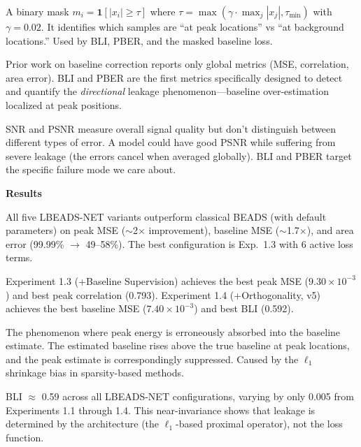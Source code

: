 \documentclass[11pt, letterpaper]{article}
\begin{document}
{A binary mask $m_i = \mathbf{1}[|x_i| \geq \tau]$ where $\tau = \max(\gamma \cdot \max_j |x_j|, \tau_{\min})$ with $\gamma = 0.02$.  It identifies which samples are ``at peak locations'' vs ``at background locations.''  Used by BLI, PBER, and the masked baseline loss.}

{Prior work on baseline correction reports only global metrics (MSE, correlation, area error).  BLI and PBER are the first metrics specifically designed to detect and quantify the \emph{directional} leakage phenomenon---baseline over-estimation localized at peak positions.}

{SNR and PSNR measure overall signal quality but don't distinguish between different types of error.  A model could have good PSNR while suffering from severe leakage (the errors cancel when averaged globally).  BLI and PBER target the specific failure mode we care about.}


\vspace{0.8em}
{\large\bfseries\sffamily\color{SectionBlue} Results}\par\vspace{0.2em}

{All five LBEADS-NET variants outperform classical BEADS (with default parameters) on peak MSE ($\sim$2$\times$ improvement), baseline MSE ($\sim$1.7$\times$), and area error (99.99\% $\to$ 49--58\%).  The best configuration is Exp.~1.3 with 6 active loss terms.}

{Experiment 1.3 (+Baseline Supervision) achieves the best peak MSE ($9.30 \times 10^{-3}$) and best peak correlation (0.793).  Experiment 1.4 (+Orthogonality, v5) achieves the best baseline MSE ($7.40 \times 10^{-3}$) and best BLI (0.592).}

{The phenomenon where peak energy is erroneously absorbed into the baseline estimate.  The estimated baseline rises above the true baseline at peak locations, and the peak estimate is correspondingly suppressed.  Caused by the $\ell_1$ shrinkage bias in sparsity-based methods.}

{BLI $\approx$ 0.59 across all LBEADS-NET configurations, varying by only 0.005 from Experiments 1.1 through 1.4.  This near-invariance shows that leakage is determined by the architecture (the $\ell_1$-based proximal operator), not the loss function.}
\end{document}
